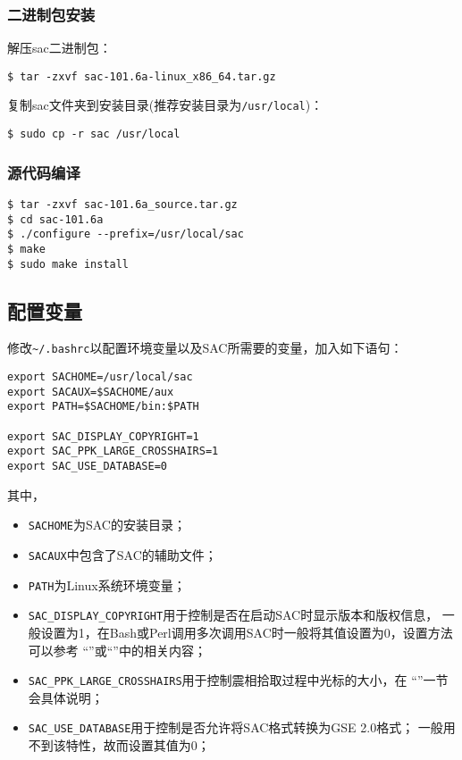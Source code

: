 \subsubsection*{二进制包安装}
解压sac二进制包：
\begin{lstlisting}[style=Shell]
$ tar -zxvf sac-101.6a-linux_x86_64.tar.gz
\end{lstlisting}

复制sac文件夹到安装目录(推荐安装目录为\lstinline{/usr/local})：
\begin{lstlisting}[style=Shell]
$ sudo cp -r sac /usr/local
\end{lstlisting}

\subsubsection*{源代码编译}
\begin{lstlisting}[style=Shell]
$ tar -zxvf sac-101.6a_source.tar.gz
$ cd sac-101.6a
$ ./configure --prefix=/usr/local/sac
$ make
$ sudo make install
\end{lstlisting}

\subsection*{配置变量}
修改\lstinline{~/.bashrc}以配置环境变量以及SAC所需要的变量，加入如下语句：
\begin{lstlisting}[style=Bash]
export SACHOME=/usr/local/sac
export SACAUX=$SACHOME/aux
export PATH=$SACHOME/bin:$PATH

export SAC_DISPLAY_COPYRIGHT=1                                                   
export SAC_PPK_LARGE_CROSSHAIRS=1
export SAC_USE_DATABASE=0                                                        
\end{lstlisting}

其中，
\begin{itemize}
\item \lstinline{SACHOME}为SAC的安装目录；
\item \lstinline{SACAUX}中包含了SAC的辅助文件；
\item \lstinline{PATH}为Linux系统环境变量；
\item \lstinline{SAC_DISPLAY_COPYRIGHT}用于控制是否在启动SAC时显示版本和版权信息，
    一般设置为1，在Bash或Perl调用多次调用SAC时一般将其值设置为0，设置方法可以参考
    ``''或``''中的相关内容；
\item \lstinline{SAC_PPK_LARGE_CROSSHAIRS}用于控制震相拾取过程中光标的大小，在
    ``''一节会具体说明；
\item \lstinline{SAC_USE_DATABASE}用于控制是否允许将SAC格式转换为GSE 2.0格式；
    一般用不到该特性，故而设置其值为0；
\end{itemize}

